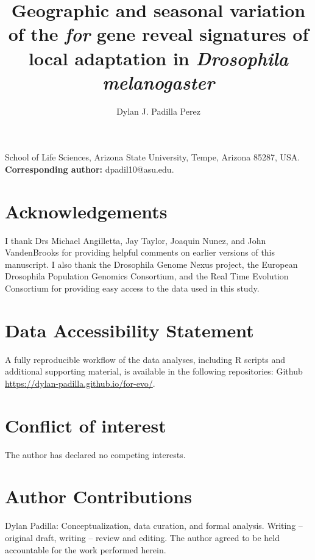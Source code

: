 \documentclass[12pt]{article}
\title{\renewcommand{\baselinestretch}{1.17}\large\bf Geographic and seasonal variation of the \textit{for} gene reveal signatures of local adaptation in \textit{Drosophila melanogaster}
}
\author{\normalsize
Dylan J. Padilla Perez
}
\begin{document}
\date{}

\maketitle

\vspace{-0.5cm}

School of Life Sciences, Arizona State University, Tempe, Arizona 85287, USA. \vspace{6pt} \\ \textbf{Corresponding author:} dpadil10@asu.edu.

\vspace{6pt}

\section*{\normalsize Acknowledgements}I thank Drs Michael Angilletta, Jay Taylor, Joaquin Nunez, and John VandenBrooks for providing helpful comments on earlier versions of this manuscript. I also thank the Drosophila Genome Nexus project, the European Drosophila Population Genomics Consortium, and the Real Time Evolution Consortium for providing easy access to the data used in this study.

\section*{\normalsize Data Accessibility Statement}%

A fully reproducible workflow of the data analyses, including R scripts and additional supporting material, is available in the following repositories: Github \url{https://dylan-padilla.github.io/for-evo/}.
\section*{\normalsize Conflict of interest}%

The author has declared no competing interests.

\section*{\normalsize Author Contributions}Dylan Padilla: Conceptualization, data curation, and formal analysis. Writing – original  draft, writing –  review and editing. The author agreed to be held accountable for the work performed herein.
\end{document}
